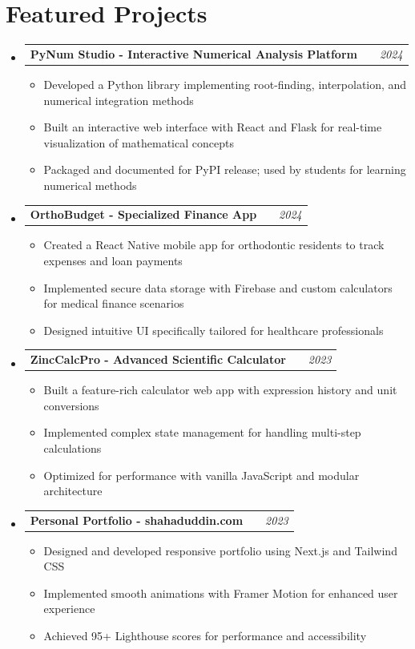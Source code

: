 \documentclass[a4paper, 10pt]{article}
\makeatletter
\newcommand{\resumeproject}[2]{
    \item
    \begin{tabularx}{\linewidth}{@{}l X r@{}}
        \textbf{#1} & & \textit{\small #2} \\
    \end{tabularx}
    \vspace{-8pt}
}
\makeatother
\begin{document}
\section{Featured Projects}
\begin{itemize}[leftmargin=0.15in]
    \resumeproject{PyNum Studio - Interactive Numerical Analysis Platform}{2024}
    \begin{itemize}
        \item Developed a Python library implementing root-finding, interpolation, and numerical integration methods
        \item Built an interactive web interface with React and Flask for real-time visualization of mathematical concepts
        \item Packaged and documented for PyPI release; used by students for learning numerical methods
    \end{itemize}
    
    \vspace{4pt}
    \resumeproject{OrthoBudget - Specialized Finance App}{2024}
    \begin{itemize}
        \item Created a React Native mobile app for orthodontic residents to track expenses and loan payments
        \item Implemented secure data storage with Firebase and custom calculators for medical finance scenarios
        \item Designed intuitive UI specifically tailored for healthcare professionals
    \end{itemize}
    
    \vspace{4pt}
    \resumeproject{ZincCalcPro - Advanced Scientific Calculator}{2023}
    \begin{itemize}
        \item Built a feature-rich calculator web app with expression history and unit conversions
        \item Implemented complex state management for handling multi-step calculations
        \item Optimized for performance with vanilla JavaScript and modular architecture
    \end{itemize}
    
    \vspace{4pt}
    \resumeproject{Personal Portfolio - shahaduddin.com}{2023}
    \begin{itemize}
        \item Designed and developed responsive portfolio using Next.js and Tailwind CSS
        \item Implemented smooth animations with Framer Motion for enhanced user experience
        \item Achieved 95+ Lighthouse scores for performance and accessibility
    \end{itemize}
\end{itemize}
\end{document}
